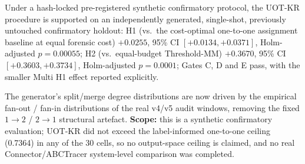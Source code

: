 Under a hash-locked pre-registered synthetic confirmatory protocol, the UOT-KR procedure is
supported on an independently generated, single-shot, previously untouched confirmatory
holdout: H1 (vs.\ the cost-optimal one-to-one assignment baseline at equal forensic cost)
$+0.0255$, 95\% CI $[+0.0134, +0.0371]$, Holm-adjusted
$p=0.00055$; H2 (vs.\ equal-budget Threshold-MM)
$+0.3670$, 95\% CI $[+0.3603, +0.3734]$,
Holm-adjusted $p=0.0001$; Gates C, D and E pass, with the smaller
Multi H1 effect reported explicitly.

The generator's split/merge degree distributions are now driven by the empirical
fan-out / fan-in distributions of the real v4/v5 audit windows, removing the fixed
$1\!\to\!2$ / $2\!\to\!1$ structural artefact. \textbf{Scope:} this is a synthetic
confirmatory evaluation; UOT-KR did not exceed the label-informed one-to-one ceiling
(0.7364) in any of the 30 cells, so no output-space ceiling is
claimed, and no real Connector/ABCTracer system-level comparison was completed.
